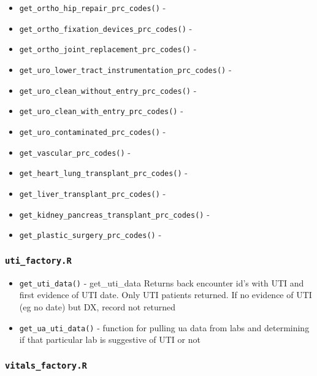 \documentclass[
]{book}
\providecommand{\tightlist}{%
  \setlength{\itemsep}{0pt}\setlength{\parskip}{0pt}}
\begin{document}
\begin{itemize}
\item
  \texttt{get\_ortho\_hip\_repair\_prc\_codes()} -
\item
  \texttt{get\_ortho\_fixation\_devices\_prc\_codes()} -
\item
  \texttt{get\_ortho\_joint\_replacement\_prc\_codes()} -
\item
  \texttt{get\_uro\_lower\_tract\_instrumentation\_prc\_codes()} -
\item
  \texttt{get\_uro\_clean\_without\_entry\_prc\_codes()} -
\item
  \texttt{get\_uro\_clean\_with\_entry\_prc\_codes()} -
\item
  \texttt{get\_uro\_contaminated\_prc\_codes()} -
\item
  \texttt{get\_vascular\_prc\_codes()} -
\item
  \texttt{get\_heart\_lung\_transplant\_prc\_codes()} -
\item
  \texttt{get\_liver\_transplant\_prc\_codes()} -
\item
  \texttt{get\_kidney\_pancreas\_transplant\_prc\_codes()} -
\item
  \texttt{get\_plastic\_surgery\_prc\_codes()} -
\end{itemize}

\hypertarget{uti_factory.r}{%
\subsubsection{\texorpdfstring{\texttt{uti\_factory.R}}{uti\_factory.R}}\label{uti_factory.r}}

\begin{itemize}
\tightlist
\item
  \texttt{get\_uti\_data()} - get\_uti\_data Returns back encounter id's with UTI and first evidence of UTI date. Only UTI patients returned. If no evidence of UTI (eg no date) but DX, record not returned
\item
  \texttt{get\_ua\_uti\_data()} - function for pulling ua data from labs and determining if that particular lab is suggestive of UTI or not
\end{itemize}

\hypertarget{vitals_factory.r}{%
\subsubsection{\texorpdfstring{\texttt{vitals\_factory.R}}{vitals\_factory.R}}\label{vitals_factory.r}}
\end{document}
